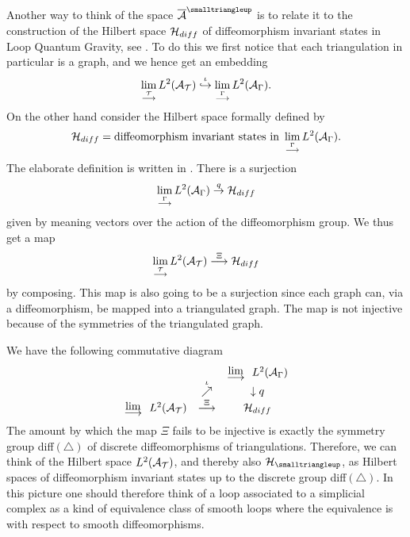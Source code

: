 \documentclass[12pt]{article}
\newcommand{\ba}{\begin{eqnarray}}
\newcommand{\ea}{\end{eqnarray}}
\def\G{\Gamma}
\def\ca{{\cal A}}
\def\ch{{\cal H}}
\def\ct{{\cal T}}
\begin{document}
Another way to think of the space $\overline{\ca}^{\smalltriangleup}$ is to relate it to the construction of the Hilbert space $\ch_{diff}$ of diffeomorphism invariant states in Loop Quantum Gravity, see \cite{Fairbairn:2004qe}. 
To do this we first notice that each triangulation in particular is a graph, and we hence get an embedding
$$\lim_{\stackrel{\ct}{\longrightarrow}} L^2(\ca_{\ct}) \stackrel{\iota}{\hookrightarrow} \lim_{\stackrel{\G}{\longrightarrow}}L^2(\ca_{\G}).$$
On the other hand consider the Hilbert space formally defined by 
$$\ch_{diff}= \hbox{diffeomorphism invariant states in }\lim_{\stackrel{\G}{\longrightarrow}}L^2(\ca_{\G}).$$
The elaborate definition is written in \cite{Fairbairn:2004qe}. There is a surjection 
$$\lim_{\stackrel{\G}{\longrightarrow}}L^2(\ca_{\G})\stackrel{q}{\to} \ch_{diff}$$
given by meaning vectors over the action of the diffeomorphism group. We thus get a map 
$$\lim_{\stackrel{\ct}{\longrightarrow}} L^2(\ca_{\ct})\stackrel{\Xi}{\longrightarrow} \ch_{diff}$$
by composing. This map is also going to be a surjection since each graph can, via a diffeomorphism, be mapped into a triangulated graph. The map is not injective because of the symmetries of the triangulated graph. 

We have the following commutative diagram
\ba
\begin{array}{ccc}
&  & \parbox{8mm}{$\stackrel{\displaystyle{\lim}} {\longrightarrow}$}  L^2(\ca_{\G})\\
&\stackrel{\iota}{\nearrow} &\downarrow q\\
\parbox{8mm}{$\stackrel{\displaystyle{\lim}} {\longrightarrow}$} L^2(\ca_{\ct}) &\stackrel{\Xi}{\longrightarrow} &\ch_{diff}
\end{array}
\ea
The amount by which the map $\Xi$ fails to be injective is exactly the symmetry group diff$(\triangle)$ of discrete diffeomorphisms of triangulations.
Therefore, we can think of the Hilbert space $L^2(\ca_{\ct})$, and thereby also $\ch_\smalltriangleup$, as Hilbert spaces of diffeomorphism invariant states up to the discrete group diff$(\triangle)$.
In this picture one should therefore think of a loop associated to a simplicial complex as a kind of equivalence class of smooth loops where the equivalence is with respect to smooth diffeomorphisms. 
\end{document}
